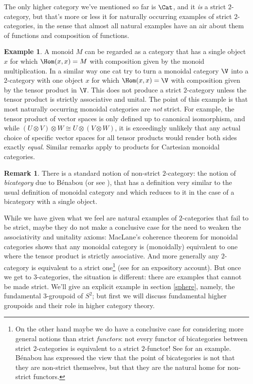 \documentclass[12pt]{amsart}
\theoremstyle{definition} \newtheorem{definition}[theorem]{Definition}
\newtheorem{example}[theorem]{Example}
\newtheorem{remark}[theorem]{Remark}
\numberwithin{equation}{section}
\begin{document}
The only higher category we've mentioned so far is $\Cat$, and it
\emph{is} a strict $2$-category, but that's more or less it for
naturally occurring examples of strict $2$-categories, in the sense
that almost all natural examples have an air about them of functions
and composition of functions.

\begin{example} A monoid $M$ can be regarded as a category that has a
single object $x$ for which $\Hom(x,x) = M$ with composition given by
the monoid multiplication. In a similar way one cat try to turn a
monoidal category $\V$ into a $2$-category with one object $x$ for
which $\Hom(x,x) = \V$ with composition given by the tensor product in
$\V$. This does not produce a strict $2$-category unless the tensor
product is strictly associative and unital. The point of this example
is that most naturally occurring monoidal categories are \emph{not}
strict. For example, the tensor product of vector spaces is only
defined up to canonical isomorphism, and while $(U \otimes V) \otimes
W \cong U \otimes (V \otimes W)$, it is exceedingly unlikely that any
actual choice of specific vector spaces for all tensor products would
render both sides exactly \emph{equal}. Similar remarks apply to
products for Cartesian monoidal categories. \end{example}

\begin{remark} There is a standard notion of non-strict $2$-category: the
notion of \emph{bicategory} due to B\'{e}nabou \cite{Benabou} (or see
\cite{Lack}), that has a definition very similar to the usual
definition of monoidal category and which reduces to it in the case of
a bicategory with a single object. \end{remark}

While we have given what we feel are natural examples of
$2$-categories that fail to be strict, maybe they do not make a
conclusive case for the need to weaken the associativity and unitality
axioms: MacLane's coherence theorem for monoidal categories shows
that any monoidal category is (monoidally) equivalent to one where the
tensor product is strictly associative. And more generally
any $2$-category is equivalent to a strict one\footnote{On the
other hand maybe we do have a conclusive case for considering more
general notions than strict \emph{functors}: not every functor of
bicategories between strict $2$-categories is equivalent to a strict
$2$-functor! See \cite[Lemma 2]{LackTri} for an example. B\'{e}nabou
has expressed the view that the point of bicategories is not that they
are non-strict themselves, but that they are the natural home for
non-strict functors.} (see \cite{LeinsterBicat} for an expository account).
But once we get to $3$-categories, the situation is different: there are
examples that cannot be made strict. We'll give an explicit example in
section \ref{sphere}, namely, the fundamental $3$-groupoid of $S^2$;
but first we will discuss fundamental higher groupoids and their role
in higher category theory.
\end{document}
